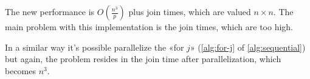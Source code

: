 The new performance is \(\displaystyle O\left(\frac{n^3}{p}\right)\) plus join times, which are valued \(n\times n\).
The main problem with this implementation is the join times, which are too high.

In a similar way it's possible parallelize the «for \(j\)» (\cref{alg:for-j} of \cref{alg:sequential}) but again, the problem resides in the join time after parallelization, which becomes \(n^3\).

\FloatBarrier